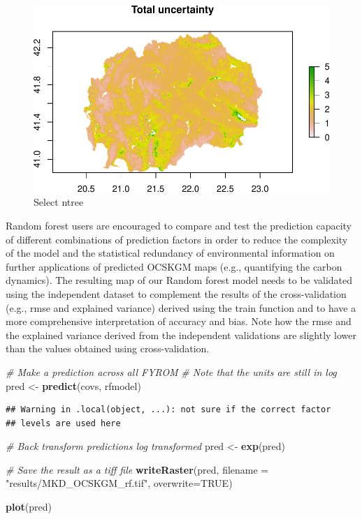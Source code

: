 \documentclass[10pt,b5paper,]{book}
\newenvironment{Shaded}{\begin{snugshade}}{\end{snugshade}}
\newcommand{\CommentTok}[1]{\textcolor[rgb]{0.56,0.35,0.01}{\textit{#1}}}
\newcommand{\DataTypeTok}[1]{\textcolor[rgb]{0.13,0.29,0.53}{#1}}
\newcommand{\KeywordTok}[1]{\textcolor[rgb]{0.13,0.29,0.53}{\textbf{#1}}}
\newcommand{\NormalTok}[1]{#1}
\newcommand{\OtherTok}[1]{\textcolor[rgb]{0.56,0.35,0.01}{#1}}
\newcommand{\StringTok}[1]{\textcolor[rgb]{0.31,0.60,0.02}{#1}}
\theoremstyle{definition}
\theoremstyle{definition}
\theoremstyle{definition}
\theoremstyle{remark}
\begin{document}
\begin{figure}
\centering
\includegraphics{SOCMapping_files/figure-latex/unnamed-chunk-63-1.pdf}
\caption{\label{fig:unnamed-chunk-63}Select ntree}
\end{figure}

Random forest users are encouraged to compare and test the prediction
capacity of different combinations of prediction factors in order to
reduce the complexity of the model and the statistical redundancy of
environmental information on further applications of predicted OCSKGM
maps (e.g., quantifying the carbon dynamics). The resulting map of our
Random forest model needs to be validated using the independent dataset
to complement the results of the cross-validation (e.g., rmse and
explained variance) derived using the train function and to have a more
comprehensive interpretation of accuracy and bias. Note how the rmse and
the explained variance derived from the independent validations are
slightly lower than the values obtained using cross-validation.

\begin{Shaded}
\begin{Highlighting}[]
\CommentTok{# Make a prediction across all FYROM}
\CommentTok{# Note that the units are still in log}
\NormalTok{pred <-}\StringTok{ }\KeywordTok{predict}\NormalTok{(covs, rfmodel)}
\end{Highlighting}
\end{Shaded}

\begin{verbatim}
## Warning in .local(object, ...): not sure if the correct factor
## levels are used here
\end{verbatim}

\begin{Shaded}
\begin{Highlighting}[]
\CommentTok{# Back transform predictions log transformed}
\NormalTok{pred <-}\StringTok{ }\KeywordTok{exp}\NormalTok{(pred)}

\CommentTok{# Save the result as a tiff file}
\KeywordTok{writeRaster}\NormalTok{(pred, }\DataTypeTok{filename =} \StringTok{"results/MKD_OCSKGM_rf.tif"}\NormalTok{,}
            \DataTypeTok{overwrite=}\OtherTok{TRUE}\NormalTok{)}

\KeywordTok{plot}\NormalTok{(pred)}
\end{Highlighting}
\end{Shaded}
\end{document}
